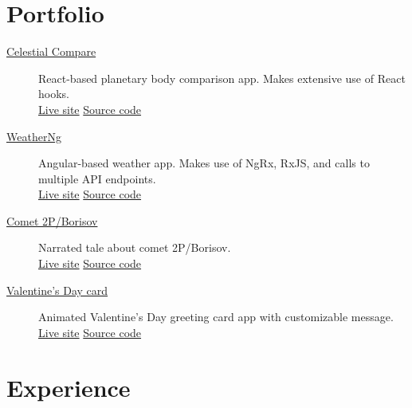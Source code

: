 \documentclass{article}
\begin{document}
\vspace{-0.5em}
\section*{Portfolio}\vspace{-0.5em}

\begin{description}
  \item[\href{https://sirkoik.github.io/Celestial-Compare}{Celestial Compare}] React-based planetary body comparison app. Makes extensive use of React hooks.\\ \href{https://sirkoik.github.io/Celestial-Compare}{Live site} \textcolor{gray}{\textbullet} \href{https://github.com/sirkoik/Celestial-Compare}{Source code}
  \item[\href{https://sirkoik.github.io/WeatherNg}{WeatherNg}] Angular-based weather app. Makes use of NgRx, RxJS, and calls to multiple API endpoints.\\ \href{https://sirkoik.github.io/WeatherNg}{Live site} \textcolor{gray}{\textbullet} \href{https://github.com/sirkoik/WeatherNg}{Source code}
  \item[\href{https://sirkoik.github.io/BorisovXmas}{Comet 2P/Borisov}] Narrated tale about comet 2P/Borisov.\\ \href{https://sirkoik.github.io/BorisovXmas}{Live site} \textcolor{gray}{\textbullet} \href{https://github.com/sirkoik/BorisovXmas}{Source code}
  \item[\href{https://sirkoik.github.io/February}{Valentine's Day card}] Animated Valentine's Day greeting card app with customizable message.\\
   \href{https://sirkoik.github.io/February}{Live site} \textcolor{gray}{\textbullet} \href{https://github.com/sirkoik/February}{Source code}
\end{description}

\vspace{-1em}
\section*{Experience}\vspace{-0.5em}
\end{document}
